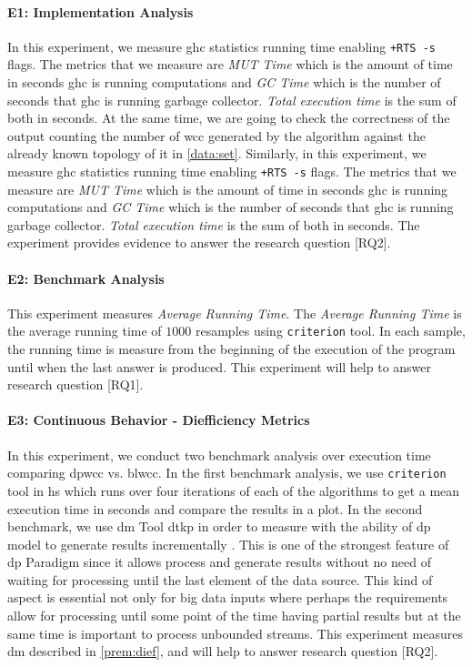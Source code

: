 \paragraph{E1: Implementation Analysis}
In this experiment, we measure \acrshort{ghc} statistics running time enabling \texttt{+RTS -s} flags. The metrics that we measure are \emph{MUT Time} which is the amount of time in seconds \acrshort{ghc} is running computations and \emph{GC Time} which is the number of seconds that \acrshort{ghc} is running garbage collector. \emph{Total execution time} is the sum of both in seconds. At the same time, we are going to check the correctness of the output counting the number of \acrshort{wcc} generated by the algorithm against the already known topology of it in \autoref{data:set}. 
Similarly, in this experiment, we measure \acrshort{ghc} statistics running time enabling \texttt{+RTS -s} flags.
The metrics that we measure are \emph{MUT Time} which is the amount of time in seconds \acrshort{ghc} is running computations and \emph{GC Time} which is the number of seconds that \acrshort{ghc} is running garbage collector. 
\emph{Total execution time} is the sum of both in seconds. The experiment provides evidence to answer the research question [RQ2].

\paragraph{E2: Benchmark Analysis}
This experiment measures \emph{Average Running Time}.
The \emph{Average Running Time} is the average running time of $1000$ resamples using \texttt{criterion} tool. 
In each sample, the running time is measure from the beginning of the execution of the program until when the last answer is produced.
This experiment will help to answer research question [RQ1].

\paragraph{E3: Continuous Behavior - Diefficiency Metrics}
In this experiment, we conduct two benchmark analysis over execution time comparing \acrshort{dpwcc} vs. \acrshort{blwcc}. 
In the first benchmark analysis, we use \texttt{criterion} tool in \acrshort{hs} which runs over four iterations of each of the algorithms to get a mean execution time in seconds and compare the results in a plot. 
In the second benchmark, we use \acrfull{dm} Tool \acrshort{dtkp} in order to measure with the ability of \acrshort{dp} model to generate results incrementally \cite{diefpaper}. 
This is one of the strongest feature of \acrshort{dp} Paradigm since it allows process and generate results without no need of waiting for processing until the last element of the data source. 
This kind of aspect is essential not only for big data inputs where perhaps the requirements allow for processing until some point of the time having partial results but at the same time is important to process unbounded streams.
This experiment measures \acrlong{dm} described in \autoref{prem:dief}, and will help to answer research question [RQ2].

